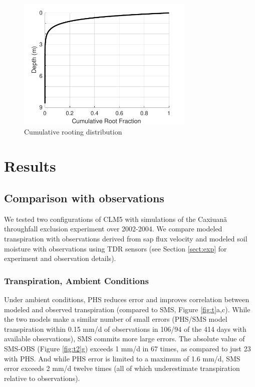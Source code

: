 \documentclass[draft,linenumbers]{agujournal}
\begin{document}
  \begin{figure}[h]
     \centering
     \includegraphics[width=20pc]{../figs3/roots.pdf}
     \caption{Cumulative rooting distribution}
     \label{roots}
  \end{figure}

\section{Results}  

\subsection{Comparison with observations}

We tested two configurations of CLM5 with simulations of the Caxiuan\~a throughfall exclusion experiment over 2002-2004. We compare modeled transpiration with observations derived from sap flux velocity and modeled soil moisture with observations using TDR sensors (see Section \ref{sect:exp} for experiment and observation details).

\subsubsection{Transpiration, Ambient Conditions}
Under ambient conditions, PHS reduces error and improves correlation between modeled and observed transpiration (compared to SMS, Figure \ref{fig:t}a,c).
While the two models make a similar number of small errors (PHS/SMS model transpiration within 0.15 mm/d of observations in 106/94 of the 414 days with available observations), SMS commits more large errors.
The absolute value of SMS-OBS (Figure \ref{fig:t2}g) exceeds 1 mm/d in 67 times, as compared to just 23 with PHS.
And while PHS error is limited to a maximum of 1.6 mm/d, SMS error exceeds 2 mm/d twelve times (all of which underestimate transpiration relative to observations).
\end{document}
